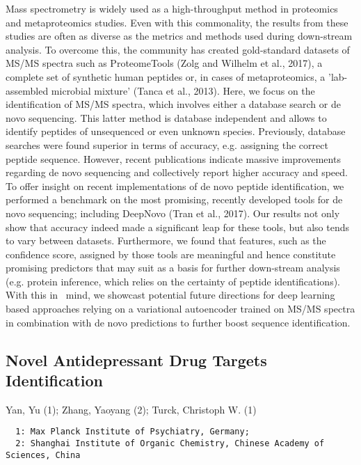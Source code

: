 {Mass spectrometry is widely used as a high-throughput method in proteomics and metaproteomics studies. Even with this commonality, the results from these studies are often as diverse as the metrics and methods used during down-stream analysis. To overcome this, the community has created gold-standard datasets of MS/MS spectra such as ProteomeTools (Zolg and Wilhelm et al., 2017), a complete set of synthetic human peptides or, in cases of metaproteomics, a ’lab-assembled microbial mixture’ (Tanca et al., 2013). Here, we focus on the identification of MS/MS spectra, which involves either a database search or de novo sequencing. This latter method is database independent and allows to identify peptides of unsequenced or even unknown species. Previously, database searches were found superior in terms of accuracy, e.g. assigning the correct peptide sequence. However, recent publications indicate massive improvements regarding de novo sequencing and collectively report higher accuracy and speed. To offer insight on recent implementations of de novo peptide identification, we performed a benchmark on the most promising, recently developed tools for de novo sequencing; including DeepNovo (Tran et al., 2017). Our results not only show that accuracy indeed made a significant leap for these tools, but also tends to vary between datasets. Furthermore, we found that features, such as the confidence score, assigned by those tools are meaningful and hence constitute promising predictors that may suit as a basis for further down-stream analysis (e.g. protein inference, which relies on the certainty of peptide identifications). With this in  mind, we showcast potential future directions for deep learning based approaches relying on a variational autoencoder trained on MS/MS spectra in combination with de novo predictions to further boost sequence identification.


\subsection*{\color{eubicRed} Novel Antidepressant Drug Targets Identification}
{\color{eubicGray}Yan, Yu (1);
Zhang, Yaoyang (2);
Turck, Christoph W. (1)}
{\color{eubicGray}\begin{verbatim}
  1: Max Planck Institute of Psychiatry, Germany;
  2: Shanghai Institute of Organic Chemistry, Chinese Academy of Sciences, China
\end{verbatim}}

}
